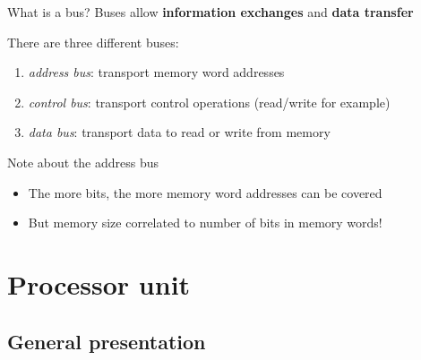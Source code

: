 \documentclass{beamer}[10pt, usepdftitle=false, handout]
\begin{document}
	\begin{frame}
	
	\begin{block}{What is a bus?}
	Buses allow \textbf{information exchanges} and \textbf{data transfer}
	\end{block}	

	\vspace*{1em}	
	
	There are three different buses:
	
	\vspace*{1em}
	
	\begin{enumerate}
	\item{\textit{address bus}: transport memory word addresses}
	\item{\textit{control bus}: transport control operations (read/write for example)}	
	\item{\textit{data bus}: transport data to read or write from memory}
	\end{enumerate}		
	
	\begin{block}{Note about the address bus}
	\begin{itemize}
	\item{The more bits, the more memory word addresses can be covered}
	\item{But memory size correlated to number of bits in memory words!}
	\end{itemize}
	\end{block}	
	
	\end{frame}

	\section{Processor unit}
	\subsection{General presentation}	
	
\end{document}
